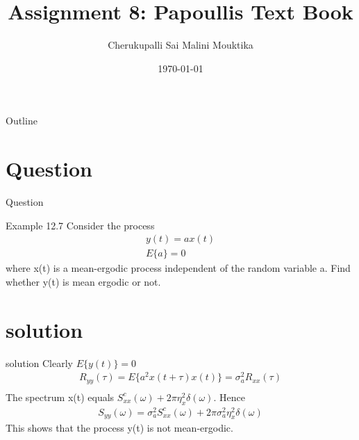 \documentclass{beamer}
\title{Assignment 8: Papoullis Text Book}
\author{Cherukupalli Sai Malini Mouktika}
\date{\today}
\numberwithin{equation}{subsection}
\begin{document}
\begin{frame}
    \titlepage 
\end{frame}

\logo{}

\begin{frame}{Outline}
    \tableofcontents
\end{frame}
\section{Question}
\begin{frame}{Question}
    \begin{block}{Example 12.7}
Consider the process 
\begin{align}
y(t) = ax(t) \\   E\lbrace a\rbrace = 0
\end{align}  
where x(t) is a mean-ergodic process independent of the random variable a. Find whether y(t) is mean ergodic or not.
\end{block}
\end{frame}
\section{solution}
\begin{frame}{solution}
Clearly $E\lbrace y(t)\rbrace = 0$ 
\begin{align}
R_{yy}(\tau) = E\lbrace a^{2}x(t+\tau)x(t)\rbrace = \sigma_{a}^{2}R_{xx}(\tau)\\
\end{align}
The spectrum x(t) equals $S_{xx}^{c}(\omega) + 2\pi \eta _{x}^{2}\delta (\omega)$. Hence
\begin{align}
    S_{yy}(\omega) = \sigma_{a}^{2}S_{xx}^{c}(\omega) + 2\pi \sigma_{a}^{2} \eta _{x}^{2}\delta (\omega)
\end{align}
This shows that the process y(t) is not mean-ergodic. 
\end{frame}
\end{document}
